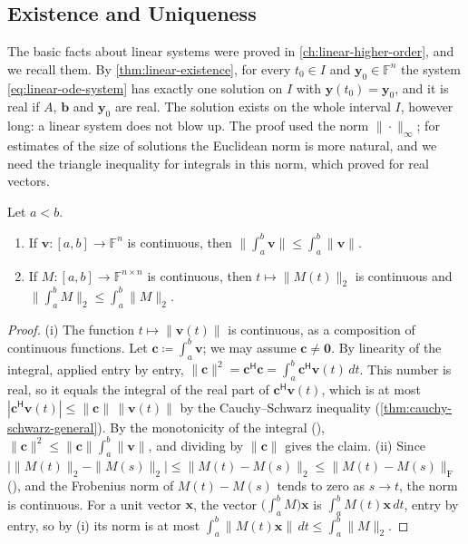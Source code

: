\subsection{Existence and Uniqueness}

The basic facts about linear systems were proved in \cref{ch:linear-higher-order}, and we recall them. By \cref{thm:linear-existence}, for every $t_0\in I$ and $\mathbf y_0\in\mathbb F^n$ the system \eqref{eq:linear-ode-system} has exactly one solution on $I$ with $\mathbf y(t_0)=\mathbf y_0$, and it is real if $A$, $\mathbf b$ and $\mathbf y_0$ are real. The solution exists on the whole interval $I$, however long: a linear system does not blow up. The proof used the norm $\|\cdot\|_\infty$; for estimates of the size of solutions the Euclidean norm is more natural, and we need the triangle inequality for integrals in this norm, which  proved for real vectors.

\begin{lemma}
\label{lem:integral-norm}
Let $a<b$.
\begin{enumerate}
\item If $\mathbf v\colon[a,b]\to\mathbb F^n$ is continuous, then $\bigl\|\int_a^b\mathbf v\bigr\|\le\int_a^b\|\mathbf v\|$.
\item If $M\colon[a,b]\to\mathbb F^{n\times n}$ is continuous, then $t\mapsto\|M(t)\|_2$ is continuous and $\bigl\|\int_a^bM\bigr\|_2\le\int_a^b\|M\|_2$.
\end{enumerate}
\end{lemma}

\begin{proof}
(i) The function $t\mapsto\|\mathbf v(t)\|$ is continuous, as a composition of continuous functions. Let $\mathbf c\coloneqq\int_a^b\mathbf v$; we may assume $\mathbf c\ne\mathbf 0$. By linearity of the integral, applied entry by entry, $\|\mathbf c\|^2=\mathbf c^{\mathsf H}\mathbf c=\int_a^b\mathbf c^{\mathsf H}\mathbf v(t)\,dt$. This number is real, so it equals the integral of the real part of $\mathbf c^{\mathsf H}\mathbf v(t)$, which is at most $|\mathbf c^{\mathsf H}\mathbf v(t)|\le\|\mathbf c\|\,\|\mathbf v(t)\|$ by the Cauchy--Schwarz inequality (\cref{thm:cauchy-schwarz-general}). By the monotonicity of the integral (), $\|\mathbf c\|^2\le\|\mathbf c\|\int_a^b\|\mathbf v\|$, and dividing by $\|\mathbf c\|$ gives the claim. (ii) Since $\bigl|\|M(t)\|_2-\|M(s)\|_2\bigr|\le\|M(t)-M(s)\|_2\le\|M(t)-M(s)\|_{\mathrm F}$ (), and the Frobenius norm of $M(t)-M(s)$ tends to zero as $s\to t$, the norm is continuous. For a unit vector $\mathbf x$, the vector $\bigl(\int_a^bM\bigr)\mathbf x$ is $\int_a^bM(t)\mathbf x\,dt$, entry by entry, so by (i) its norm is at most $\int_a^b\|M(t)\mathbf x\|\,dt\le\int_a^b\|M\|_2$.
\end{proof}

